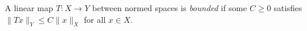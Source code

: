 
A linear map $T:X\to Y$ between normed spaces is \emph{bounded} if some $C\ge0$ satisfies $\|Tx\|_Y\le C\|x\|_X$ for all $x\in X$.
